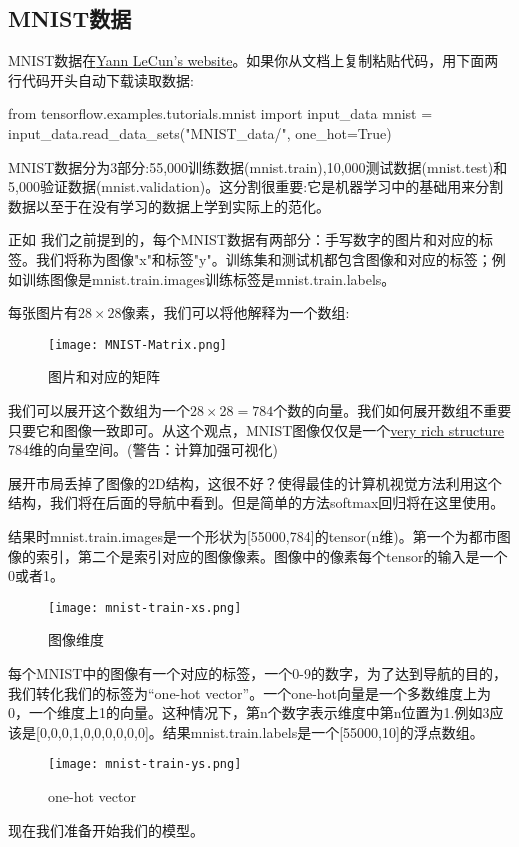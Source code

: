 \subsection{MNIST数据}
MNIST数据在\href{http://yann.lecun.com/exdb/mnist/}{Yann LeCun's website}。如果你从文档上复制粘贴代码，用下面两行代码开头自动下载读取数据:
\begin{pythoncode}
from tensorflow.examples.tutorials.mnist import input_data
mnist = input_data.read_data_sets("MNIST_data/", one_hot=True)
\end{pythoncode}
MNIST数据分为3部分:55,000训练数据(mnist.train),10,000测试数据(mnist.test)和5,000验证数据(mnist.validation)。这分割很重要:它是机器学习中的基础用来分割数据以至于在没有学习的数据上学到实际上的范化。

正如 我们之前提到的，每个MNIST数据有两部分：手写数字的图片和对应的标签。我们将称为图像"x"和标签"y"。训练集和测试机都包含图像和对应的标签；例如训练图像是mnist.train.images训练标签是mnist.train.labels。

每张图片有$28\times28$像素，我们可以将他解释为一个数组:
\begin{figure}[H]
\centering
\texttt{[image: MNIST-Matrix.png]}
\caption{图片和对应的矩阵}
\end{figure}
我们可以展开这个数组为一个$28\times28=784$个数的向量。我们如何展开数组不重要只要它和图像一致即可。从这个观点，MNIST图像仅仅是一个\href{https://colah.github.io/posts/2014-10-Visualizing-MNIST/}{very rich structure }784维的向量空间。(警告：计算加强可视化)

展开市局丢掉了图像的2D结构，这很不好？使得最佳的计算机视觉方法利用这个结构，我们将在后面的导航中看到。但是简单的方法softmax回归将在这里使用。

结果时mnist.train.images是一个形状为[55000,784]的tensor(n维)。第一个为都市图像的索引，第二个是索引对应的图像像素。图像中的像素每个tensor的输入是一个0或者1。
\begin{figure}[H]
\centering
\texttt{[image: mnist-train-xs.png]}
\caption{图像维度}
\end{figure}
每个MNIST中的图像有一个对应的标签，一个0-9的数字，为了达到导航的目的，我们转化我们的标签为“one-hot vector”。一个one-hot向量是一个多数维度上为0，一个维度上1的向量。这种情况下，第n个数字表示维度中第n位置为1.例如3应该是[0,0,0,1,0,0,0,0,0,0]。结果mnist.train.labels是一个[55000,10]的浮点数组。
\begin{figure}[H]
\centering
\texttt{[image: mnist-train-ys.png]}
\caption{one-hot vector}
\end{figure}
现在我们准备开始我们的模型。
